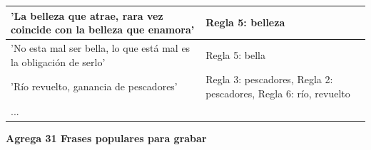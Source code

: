 \documentclass[mathserif]{beamer}%
\begin{document}
\begin{frame}
\begin{longtable}{| p{} || p{} |}
		'La belleza que atrae, rara vez coincide con la belleza que enamora' & Regla 5: belleza  \\ \hline
		'No esta mal ser bella, lo que está mal es la obligación de serlo' & Regla 5: bella \\ \hline
		'Río revuelto, ganancia de pescadores' & Regla 3: pescadores, Regla 2: pescadores, Regla 6: río, revuelto  \\ \hline
%		
		... & \\ \hline
		\end{longtable}
		
		\textbf{Agrega 31 Frases populares para grabar}
\end{frame}
\end{document}
